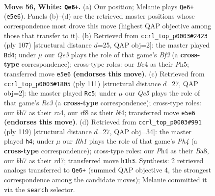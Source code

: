 \documentclass[11pt]{article}
\begin{document}
\clearpage

\begin{figure}[p]\centering
\begin{subfigure}{0.46\textwidth}\centering
\resizebox{\linewidth}{!}{%
\newchessgame
\chessboard[
  setfen={5r2/1b6/7k/4Q3/2B4P/8/1p4P1/6KR w - - 3 56},
  showmover=false,
  pgfstyle=straightmove, color=movearrow, markmove={e5-e6}
]}
\caption{}
\end{subfigure}\hfill
\begin{subfigure}{0.46\textwidth}\centering
\resizebox{\linewidth}{!}{%
\newchessgame
\chessboard[
  setfen={8/8/P1k1pb2/1p5p/2r5/1K6/4R2B/8 b - - 3 54},
  showmover=false,
  pgfstyle=straightmove, color=movearrow, markmove={f6-d4}
]}
\caption{}
\end{subfigure}
\\[4pt]
\begin{subfigure}{0.46\textwidth}\centering
\resizebox{\linewidth}{!}{%
\newchessgame
\chessboard[
  setfen={8/3k1K1p/1br3p1/8/R4B2/8/7P/8 b - - 4 56},
  showmover=false,
  pgfstyle=straightmove, color=movearrow, markmove={c6-c5}
]}
\caption{}
\end{subfigure}\hfill
\begin{subfigure}{0.46\textwidth}\centering
\resizebox{\linewidth}{!}{%
\newchessgame
\chessboard[
  setfen={b7/P2R2pk/8/r6p/5B2/8/5K2/8 b - - 6 60},
  showmover=false,
  pgfstyle=straightmove, color=movearrow, markmove={h5-h4}
]}
\caption{}
\end{subfigure}
\caption{\textbf{Move 56, White: \texttt{Qe6+}.} (a) Our position; Melanie plays \texttt{Qe6+} (\texttt{e5e6}). Panels (b)--(d) are the retrieved master positions whose correspondence most drove this move (highest QAP objective among those that transfer to it). (b) Retrieved from \texttt{ccrl\_top\_p0003\#2423} (ply 107) [structural distance $d$=25, QAP obj=2]: the master played \texttt{Bd4}; under $\mu$ our \emph{Qe5} plays the role of that game's \emph{Bf3} (a \textbf{cross-type} correspondence); cross-type roles: our \emph{B}c4 as their \emph{P}h5; transferred move \texttt{e5e6} \textbf{(endorses this move)}. (c) Retrieved from \texttt{ccrl\_top\_p0003\#1805} (ply 111) [structural distance $d$=27, QAP obj=2]: the master played \texttt{Rc5}; under $\mu$ our \emph{Qe5} plays the role of that game's \emph{Rc3} (a \textbf{cross-type} correspondence); cross-type roles: our \emph{b}b7 as their \emph{r}a4, our \emph{r}f8 as their \emph{b}f4; transferred move \texttt{e5e6} \textbf{(endorses this move)}. (d) Retrieved from \texttt{ccrl\_top\_p0003\#991} (ply 119) [structural distance $d$=27, QAP obj=34]: the master played \texttt{h4}; under $\mu$ our \emph{Rh1} plays the role of that game's \emph{Ph4} (a \textbf{cross-type} correspondence); cross-type roles: our \emph{P}h4 as their \emph{B}a8, our \emph{b}b7 as their \emph{r}d7; transferred move \texttt{h1h3}. Synthesis: 2 retrieved analogs transferred to \texttt{Qe6+} (summed QAP objective 4, the strongest correspondence among the candidate moves); Melanie committed it via the \texttt{search} selector.}
\label{fig:thought-m110}
\end{figure}
\end{document}
